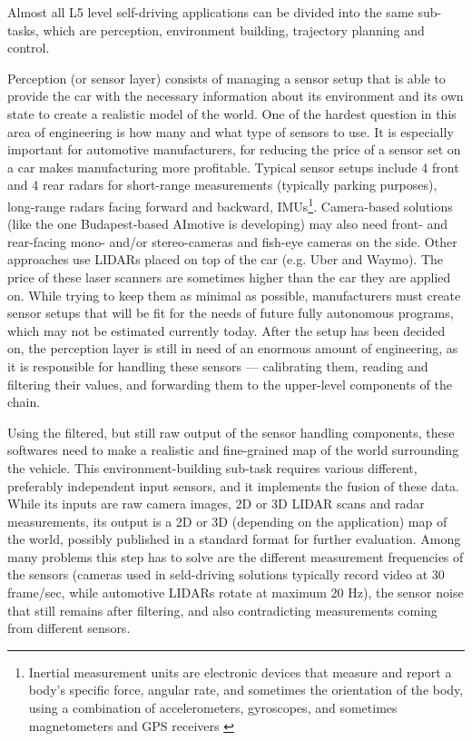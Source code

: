 Almost all L5 level self-driving applications can be divided into the same sub-tasks, which are perception, environment building, trajectory planning and control.

Perception (or sensor layer) consists of managing a sensor setup that is able to provide the car with the necessary information about its environment and its own state to create a realistic model of the world. One of the hardest question in this area of engineering is how many and what type of sensors to use. It is especially important for automotive manufacturers, for reducing the price of a sensor set on a car makes manufacturing more profitable. Typical sensor setups include 4 front and 4 rear radars for short-range measurements (typically parking purposes), long-range radars facing forward and backward, IMUs\footnote{Inertial measurement units are electronic devices that measure and report a body's specific force, angular rate, and sometimes the orientation of the body, using a combination of accelerometers, gyroscopes, and sometimes magnetometers and GPS receivers \cite{wiki_imu}}. Camera-based solutions (like the one Budapest-based AImotive is developing) may also need front- and rear-facing mono- and/or stereo-cameras and fish-eye cameras on the side. Other approaches use LIDARs placed on top of the car (e.g. Uber and Waymo). The price of these laser scanners are sometimes higher than the car they are applied on. While trying to keep them as minimal as possible, manufacturers must create sensor setups that will be fit for the needs of future fully autonomous programs, which may not be estimated currently today. After the setup has been decided on, the perception layer is still in need of an enormous amount of engineering, as it is responsible for handling these sensors --- calibrating them, reading and filtering their values, and forwarding them to the upper-level components of the chain.

Using the filtered, but still raw output of the sensor handling components, these softwares need to make a realistic and fine-grained map of the world surrounding the vehicle. This environment-building sub-task requires various different, preferably independent input sensors, and it implements the fusion of these data. While its inputs are raw camera images, 2D or 3D LIDAR scans and radar measurements, its output is a 2D or 3D (depending on the application) map of the world, possibly published in a standard format for further evaluation. Among many problems this step has to solve are the different measurement frequencies of the sensors (cameras used in seld-driving solutions typically record video at 30 frame/sec, while automotive LIDARs rotate at maximum 20 Hz), the sensor noise that still remains after filtering, and also contradicting measurements coming from different sensors.


